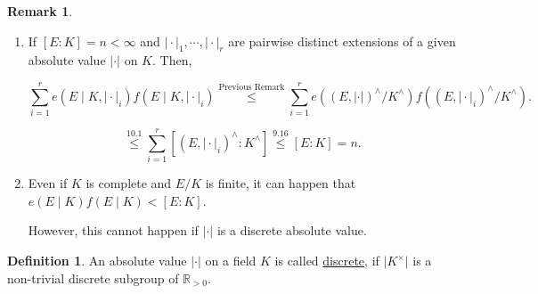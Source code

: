 \documentclass[openany]{amsbook}
\numberwithin{section}{chapter}
\theoremstyle{definition}
\newtheorem*{definition}{Definition}
\newtheorem*{remark}{Remark}
\begin{document}
\begin{remark}
    \begin{enumerate}[label=\arabic*)]
        \item If \([E:K] = n <\infty\) and \(\vert \cdot \vert_1, \cdots , \vert \cdot \vert_r\) are pairwise distinct extensions of a given absolute value \(\vert \cdot \vert\) on \(K\). Then,
        
        \[
            \sum_{i=1}^r e(E \mid K, \vert \cdot \vert_i) f(E \mid K, \vert \cdot \vert_i) \overset{\text{Previous Remark}}{\leq} \sum_{i=1}^r e((E,\vert \cdot \vert)^\wedge / K^\wedge) f((E,\vert \cdot \vert_i)^\wedge / K^\wedge).
        \]

        \[
            \overset{10.1}{\leq} \sum_{i=1}^r [(E,\vert \cdot \vert_i)^\wedge : K^\wedge] \overset{9.16}{\leq} [E:K] = n.
        \]

        \item Even if \(K\) is complete and \(E / K\) is finite, it can happen that \(e(E \mid K) f(E \mid K) < [E:K]\).
        
        However, this cannot happen if \(\vert \cdot \vert\) is a discrete absolute value.

    \end{enumerate} 
\end{remark}

\begin{definition}
    An absolute value \(\vert \cdot \vert\) on a field \(K\) is called \underline{discrete}, if \(\vert K^\times \vert\) is a non-trivial discrete subgroup of \(\mathbb{R}_{>0}\).
\end{definition}
\end{document}
